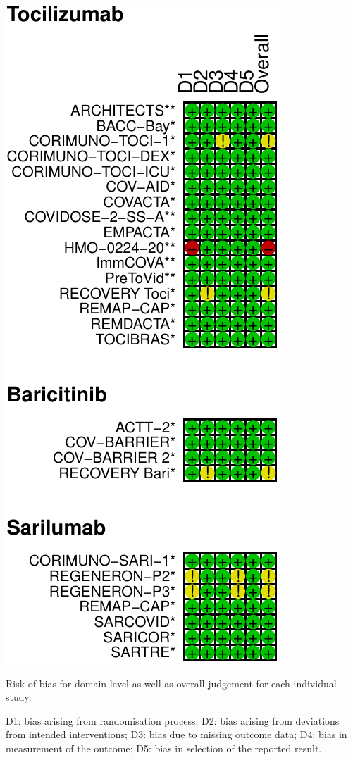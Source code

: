 \documentclass[
  12pt,
]{article}
\begin{document}
\begin{center}\includegraphics{supplementary_material_files/figure-latex/unnamed-chunk-6-1} \end{center}

Risk of bias for domain-level as well as overall judgement for each
individual study.

D1: bias arising from randomisation process; D2: bias arising from
deviations from intended interventions; D3: bias due to missing outcome
data; D4: bias in measurement of the outcome; D5: bias in selection of
the reported result.
\end{document}
